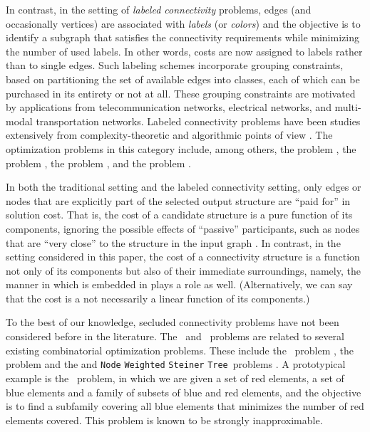 \documentclass[12pt]{article}
\newcommand{\PS}[0]{ 
}
\newcommand{\PP}[0]{ }
\newcommand{\NodeSteiner}[0]{\mbox{\tt Node} \mbox{\tt Weighted}
\mbox{\tt Steiner} \mbox{\tt Tree}}
\newcommand{\RBSC}[0]{  }
\begin{document}
In contrast, in the setting of \emph{labeled connectivity} problems, edges (and occasionally vertices) are associated with \emph{labels} (or \emph{colors}) and the objective is to identify a subgraph  that satisfies the connectivity requirements while minimizing the number of used labels. In other words, costs are now assigned to labels rather than to single edges. Such labeling schemes incorporate grouping constraints, based on partitioning the set of available edges into classes, each of which can be purchased in its entirety or not at all. These grouping constraints are motivated by applications from telecommunication networks, electrical networks, and multi-modal transportation networks. Labeled connectivity problems have been studies extensively from complexity-theoretic and algorithmic points of view \cite{DS99,YuanVJ05,HassinMS07,FellowsGK10}. The optimization problems in this category include, among others, the  problem \cite{HassinMS07,YuanVJ05}, the  problem \cite{KrumkeW98,HassinMS07}, the  problem \cite{ZhangCTZ11}, and the  problem \cite{Monnot05}.

In both the traditional setting and the labeled connectivity setting, only edges or nodes that are explicitly part of the selected output structure are ``paid for'' in solution cost. That is, the cost of a candidate structure is a pure function of its components, ignoring the possible effects of ``passive'' participants, such as nodes that are ``very close'' to the structure in the input graph .  In contrast, in the setting considered in this paper, the cost of a connectivity structure  is a function not only of its components but also of their immediate surroundings, namely, the manner in which  is embedded in  plays a role as well. (Alternatively, we can say that the cost is a not necessarily a linear function of its components.)

To the best of our knowledge, secluded connectivity problems have not been considered before in the literature. The \PP\ and \PS\  problems are related to several existing combinatorial optimization problems. These include the \RBSC\ problem \cite{CarrDKM00,Peleg07}, the   problem \cite{HassinMS07,YuanVJ05} and the  \cite{Kar72} and \NodeSteiner\ problems \cite{KleinR95}. A prototypical example is the \RBSC\ problem, in which we are given a set  of red elements, a set  of blue elements and a family  of subsets of blue and red elements, and the objective is to find a subfamily  covering all blue elements that minimizes the number of red elements covered. This problem is known to be strongly inapproximable.
\end{document}
